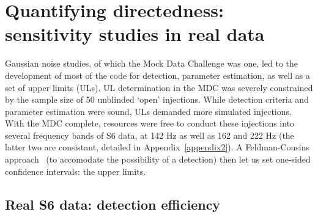 
        \section{Quantifying directedness: sensitivity studies in real data}
        \label{quant_directed}

Gaussian noise studies, of which the Mock Data Challenge was one, led to the development of most of the code for detection, parameter estimation, as well as a set of upper limits (ULs).
UL determination in the MDC was severely constrained by the sample size of 50 unblinded `open' injections.
While detection criteria and parameter estimation were sound, ULs demanded more simulated injections.
With the MDC complete, resources were free to conduct these injections into several frequency bands of S6 data, at 142 Hz as well as 162 and 222 Hz (the latter two are consistant, detailed in Appendix~\ref{appendix2}).
A Feldman-Cousins approach~\cite{FeldmanCousins1998} (to accomodate the possibility of a detection) then let us set one-sided confidence intervals: the upper limits.





        \subsection{Real S6 data: detection efficiency}

